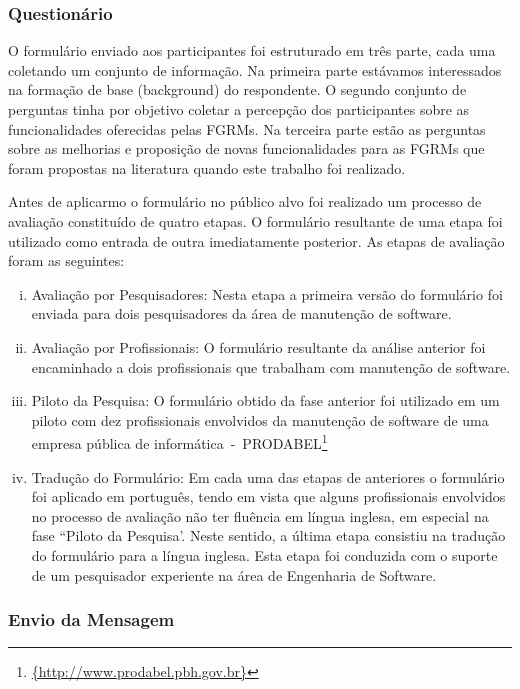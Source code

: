 \subsubsection{Questionário}
\label{subsubsec:questionario}

O formulário enviado aos participantes foi estruturado em três parte, cada uma
coletando um conjunto de informação. Na primeira parte estávamos interessados na
formação de base (background) do respondente. O segundo conjunto de perguntas
tinha por objetivo  coletar a percepção dos participantes sobre as
funcionalidades oferecidas pelas FGRMs\@. Na terceira parte estão as perguntas
sobre as melhorias e proposição de novas funcionalidades para as FGRMs que foram
propostas na literatura quando este trabalho foi realizado.

Antes de aplicarmo o formulário no público alvo foi realizado um processo de
avaliação constituído de quatro etapas. O formulário resultante de uma etapa foi
utilizado como entrada de outra imediatamente posterior. As etapas de avaliação
foram as seguintes:

\begin{enumerate}[(i)]
	\item Avaliação por Pesquisadores: Nesta etapa a primeira versão do
		formulário foi enviada para dois pesquisadores da área de manutenção de
		software.
	\item Avaliação por Profissionais: O formulário resultante da análise
		anterior foi encaminhado a dois profissionais que trabalham com
		manutenção de software.
	\item Piloto da Pesquisa: O formulário obtido da fase anterior foi utilizado
		em um piloto com dez profissionais envolvidos da manutenção de software
		de uma empresa pública de
		informática~-~PRODABEL\footnote{\url{{http://www.prodabel.pbh.gov.br}}}
	\item Tradução do Formulário: Em cada uma das etapas de anteriores o
		formulário foi aplicado em português, tendo em vista que alguns
		profissionais envolvidos no processo de avaliação não ter fluência em
		língua inglesa, em especial na fase ``Piloto da Pesquisa'. Neste
		sentido, a última etapa consistiu na tradução do formulário para a
		língua inglesa. Esta etapa foi conduzida com  o suporte de um
		pesquisador experiente na área de Engenharia de Software.
\end{enumerate}

\subsubsection{Envio da Mensagem}
\label{subsubsub:envio_mensagem}

